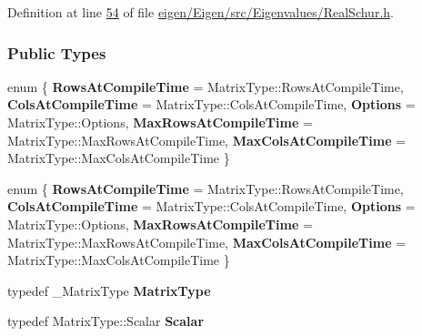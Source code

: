 Definition at line \hyperlink{eigen_2_eigen_2src_2_eigenvalues_2_real_schur_8h_source_l00054}{54} of file \hyperlink{eigen_2_eigen_2src_2_eigenvalues_2_real_schur_8h_source}{eigen/\+Eigen/src/\+Eigenvalues/\+Real\+Schur.\+h}.

\subsubsection*{Public Types}
\begin{DoxyCompactItemize}
\item 
\mbox{\label{group___eigenvalues___module_ab0f265230db2cdb400846fd4d9676f04}} 
enum \{ \newline
{\bfseries Rows\+At\+Compile\+Time} = Matrix\+Type\+:\+:Rows\+At\+Compile\+Time, 
{\bfseries Cols\+At\+Compile\+Time} = Matrix\+Type\+:\+:Cols\+At\+Compile\+Time, 
{\bfseries Options} = Matrix\+Type\+:\+:Options, 
{\bfseries Max\+Rows\+At\+Compile\+Time} = Matrix\+Type\+:\+:Max\+Rows\+At\+Compile\+Time, 
\newline
{\bfseries Max\+Cols\+At\+Compile\+Time} = Matrix\+Type\+:\+:Max\+Cols\+At\+Compile\+Time
 \}
\item 
\mbox{\label{group___eigenvalues___module_a41f8db9e06034610b7df49a1eb93ddbc}} 
enum \{ \newline
{\bfseries Rows\+At\+Compile\+Time} = Matrix\+Type\+:\+:Rows\+At\+Compile\+Time, 
{\bfseries Cols\+At\+Compile\+Time} = Matrix\+Type\+:\+:Cols\+At\+Compile\+Time, 
{\bfseries Options} = Matrix\+Type\+:\+:Options, 
{\bfseries Max\+Rows\+At\+Compile\+Time} = Matrix\+Type\+:\+:Max\+Rows\+At\+Compile\+Time, 
\newline
{\bfseries Max\+Cols\+At\+Compile\+Time} = Matrix\+Type\+:\+:Max\+Cols\+At\+Compile\+Time
 \}
\item 
\mbox{\label{group___eigenvalues___module_a2c400724529c2d19e886e865244f6ea7}} 
typedef \+\_\+\+Matrix\+Type {\bfseries Matrix\+Type}
\item 
\mbox{\label{group___eigenvalues___module_a9f63de2b06466efed32c6e721bde71c9}} 
typedef Matrix\+Type\+::\+Scalar {\bfseries Scalar}
\item 
\mbox{\label{group___eigenvalues___module_a269c5cf978680481656ad5e86d45894a}} 

\end{DoxyCompactItemize}

